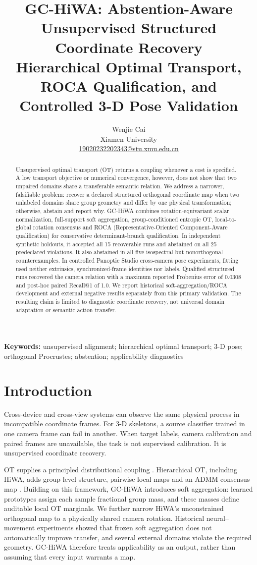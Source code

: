 \documentclass[10pt,a4paper]{article}
\title{\textbf{GC-HiWA: Abstention-Aware Unsupervised Structured Coordinate Recovery}\\[.35em]\large Hierarchical Optimal Transport, ROCA Qualification, and Controlled 3-D Pose Validation}
\author{Wenjie Cai\\Xiamen University\\\href{mailto:19020232202343@stu.xmu.edu.cn}{19020232202343@stu.xmu.edu.cn}}\date{}
\begin{document}
\maketitle
\begin{abstract}
Unsupervised optimal transport (OT) returns a coupling whenever a cost is specified. A low transport objective or numerical convergence, however, does not show that two unpaired domains share a transferable semantic relation. We address a narrower, falsifiable problem: recover a declared structured orthogonal coordinate map when two unlabeled domains share group geometry and differ by one physical transformation; otherwise, abstain and report why. GC-HiWA combines rotation-equivariant scalar normalization, full-support soft aggregation, group-conditioned entropic OT, local-to-global rotation consensus and ROCA (Representative-Oriented Component-Aware qualification) for conservative determinant-branch qualification. In independent synthetic holdouts, it accepted all 15 recoverable runs and abstained on all 25 predeclared violations. It also abstained in all five isospectral but nonorthogonal counterexamples. In controlled Panoptic Studio cross-camera pose experiments, fitting used neither extrinsics, synchronized-frame identities nor labels. Qualified structured runs recovered the camera relation with a maximum reported Frobenius error of 0.0308 and post-hoc paired Recall@1 of 1.0. We report historical soft-aggregation/ROCA development and external negative results separately from this primary validation. The resulting claim is limited to diagnostic coordinate recovery, not universal domain adaptation or semantic-action transfer.
\end{abstract}
\noindent\textbf{Keywords:} unsupervised alignment; hierarchical optimal transport; 3-D pose; orthogonal Procrustes; abstention; applicability diagnostics

\section{Introduction}
Cross-device and cross-view systems can observe the same physical process in incompatible coordinate frames. For 3-D skeletons, a source classifier trained in one camera frame can fail in another. When target labels, camera calibration and paired frames are unavailable, the task is not supervised calibration. It is unsupervised coordinate recovery.

OT supplies a principled distributional coupling \cite{cuturi2013sinkhorn,peyre2019computational}. Hierarchical OT, including HiWA, adds group-level structure, pairwise local maps and an ADMM consensus map \cite{lee2019hierarchical}. Building on this framework, GC-HiWA introduces soft aggregation: learned prototypes assign each sample fractional group mass, and these masses define auditable local OT marginals. We further narrow HiWA's unconstrained orthogonal map to a physically shared camera rotation. Historical neural--movement experiments showed that frozen soft aggregation does not automatically improve transfer, and several external domains violate the required geometry. GC-HiWA therefore treats applicability as an output, rather than assuming that every input warrants a map.
\end{document}
